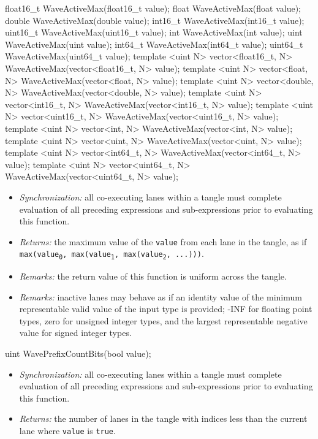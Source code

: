\begin{HLSL}
float16_t WaveActiveMax(float16_t value);
float WaveActiveMax(float value);
double WaveActiveMax(double value);
int16_t WaveActiveMax(int16_t value);
uint16_t WaveActiveMax(uint16_t value);
int WaveActiveMax(int value);
uint WaveActiveMax(uint value);
int64_t WaveActiveMax(int64_t value);
uint64_t WaveActiveMax(uint64_t value);
template <uint N> vector<float16_t, N> WaveActiveMax(vector<float16_t, N> value);
template <uint N> vector<float, N> WaveActiveMax(vector<float, N> value);
template <uint N> vector<double, N> WaveActiveMax(vector<double, N> value);
template <uint N> vector<int16_t, N> WaveActiveMax(vector<int16_t, N> value);
template <uint N> vector<uint16_t, N> WaveActiveMax(vector<uint16_t, N> value);
template <uint N> vector<int, N> WaveActiveMax(vector<int, N> value);
template <uint N> vector<uint, N> WaveActiveMax(vector<uint, N> value);
template <uint N> vector<int64_t, N> WaveActiveMax(vector<int64_t, N> value);
template <uint N> vector<uint64_t, N> WaveActiveMax(vector<uint64_t, N> value);
\end{HLSL}

\begin{itemize}
  \item \textit{Synchronization:} all co-executing \gls{lane}s within a \gls{tangle}
  must complete evaluation of all preceding expressions and sub-expressions
  prior to evaluating this function.
  \item \textit{Returns:} the maximum value of the \texttt{value} from each
  \gls{lane} in the \gls{tangle}, as if \texttt{max(value\textsubscript{0},
  max(value\textsubscript{1}, max(value\textsubscript{2}, ...)))}.
  \item \textit{Remarks:} the return value of this function is uniform across
  the \gls{tangle}.
  \item \textit{Remarks:} inactive \gls{lane}s may behave as if an identity
  value of the minimum representable valid value of the input type is provided;
  -INF for floating point types, zero for unsigned integer types, and the
  largest representable negative value for signed integer types.
\end{itemize}

\begin{HLSL}
uint WavePrefixCountBits(bool value);
\end{HLSL}

\begin{itemize}
  \item \textit{Synchronization:} all co-executing \gls{lane}s within a \gls{tangle}
  must complete evaluation of all preceding expressions and sub-expressions
  prior to evaluating this function.
  \item \textit{Returns:} the number of \gls{lane}s in the \gls{tangle} with
  indices less than the current \gls{lane} where \texttt{value} is
  \texttt{true}.
\end{itemize}

